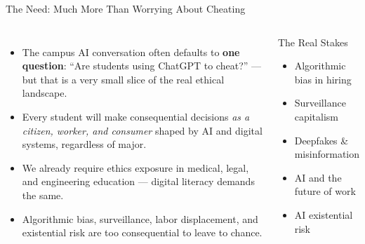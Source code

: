 \documentclass[aspectratio=169,10pt]{beamer}
\begin{document}
\begin{frame}{The Need: Much More Than Worrying About Cheating}
\begin{columns}[c]
\begin{itemize}
  \item The campus AI conversation often defaults to \textbf{one question}: ``Are students using ChatGPT to cheat?'' --- but that is a very small slice of the real ethical landscape.
  \item Every student will make consequential decisions \emph{as a citizen, worker, and consumer} shaped by AI and digital systems, regardless of major.
  \item We already require ethics exposure in medical, legal, and engineering education --- digital literacy demands the same.
  \item Algorithmic bias, surveillance, labor displacement, and existential risk are too consequential to leave to chance.
\end{itemize}
\begin{alertblock}{The Real Stakes}
\footnotesize
\begin{itemize}
  \item Algorithmic bias in hiring
  \item Surveillance capitalism
  \item Deepfakes \& misinformation
  \item AI and the future of work
  \item AI existential risk
\end{itemize}
\end{alertblock}
\end{columns}
\end{frame}
\end{document}
